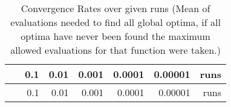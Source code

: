 \documentclass[12pt,a4paper]{article}
\begin{document}
\begin{longtable}[c]{@{}crrrrrr@{}}
\caption{Convergence Rates over given runs (Mean of evaluations needed
to find all global optima, if all optima have never been found the
maximum allowed evaluations for that function were
taken.)}\tabularnewline
\toprule
\begin{minipage}[b]{0.11\columnwidth}\centering\strut
~
\strut\end{minipage} &
\begin{minipage}[b]{0.08\columnwidth}\raggedleft\strut
0.1
\strut\end{minipage} &
\begin{minipage}[b]{0.08\columnwidth}\raggedleft\strut
0.01
\strut\end{minipage} &
\begin{minipage}[b]{0.09\columnwidth}\raggedleft\strut
0.001
\strut\end{minipage} &
\begin{minipage}[b]{0.10\columnwidth}\raggedleft\strut
0.0001
\strut\end{minipage} &
\begin{minipage}[b]{0.11\columnwidth}\raggedleft\strut
0.00001
\strut\end{minipage} &
\begin{minipage}[b]{0.07\columnwidth}\raggedleft\strut
runs
\strut\end{minipage}\tabularnewline
\midrule
\endfirsthead
\toprule
\begin{minipage}[b]{0.11\columnwidth}\centering\strut
~
\strut\end{minipage} &
\begin{minipage}[b]{0.08\columnwidth}\raggedleft\strut
0.1
\strut\end{minipage} &
\begin{minipage}[b]{0.08\columnwidth}\raggedleft\strut
0.01
\strut\end{minipage} &
\begin{minipage}[b]{0.09\columnwidth}\raggedleft\strut
0.001
\strut\end{minipage} &
\begin{minipage}[b]{0.10\columnwidth}\raggedleft\strut
0.0001
\strut\end{minipage} &
\begin{minipage}[b]{0.11\columnwidth}\raggedleft\strut
0.00001
\strut\end{minipage} &
\begin{minipage}[b]{0.07\columnwidth}\raggedleft\strut
runs
\strut\end{minipage}\tabularnewline

\end{longtable}
\end{document}
